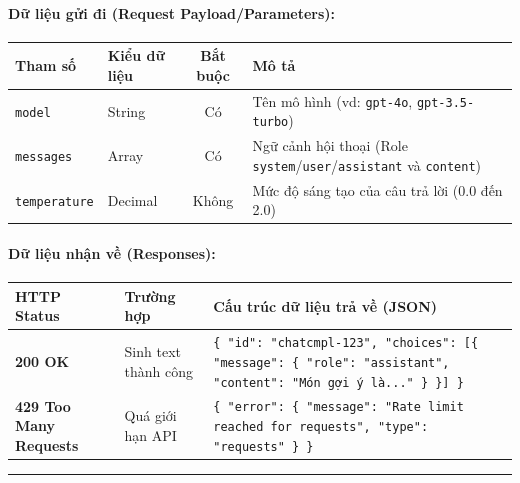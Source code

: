 \documentclass[12pt,a4paper]{article}
\begin{document}
\paragraph{Dữ liệu gửi đi (Request Payload/Parameters):}
\begin{longtable}{|>{\raggedright\arraybackslash}p{2.8cm}|>{\raggedright\arraybackslash}p{2.2cm}|c|>{\raggedright\arraybackslash}p{7.0cm}|}
\hline
\textbf{Tham số} & \textbf{Kiểu dữ liệu} & \textbf{Bắt buộc} & \textbf{Mô tả} \\ \hline
\endhead
\texttt{model} & String & Có & Tên mô hình (vd: \texttt{gpt-4o}, \texttt{gpt-3.5-turbo}) \\ \hline
\texttt{messages} & Array & Có & Ngữ cảnh hội thoại (Role \texttt{system}/\texttt{user}/\texttt{assistant} và \texttt{content}) \\ \hline
\texttt{temperature} & Decimal & Không & Mức độ sáng tạo của câu trả lời (0.0 đến 2.0) \\ \hline
\end{longtable}

\paragraph{Dữ liệu nhận về (Responses):}
\begin{longtable}{|>{\raggedright\arraybackslash}p{2.8cm}|>{\raggedright\arraybackslash}p{3.2cm}|>{\raggedright\arraybackslash}p{8.0cm}|}
\hline
\textbf{HTTP Status} & \textbf{Trường hợp} & \textbf{Cấu trúc dữ liệu trả về (JSON)} \\ \hline
\endhead
\textbf{200 OK} & Sinh text thành công & \texttt{\{ "id": "chatcmpl-123", "choices": [\{ "message": \{ "role": "assistant", "content": "Món gợi ý là..." \} \}] \}} \\ \hline
\textbf{429 Too Many Requests} & Quá giới hạn API & \texttt{\{ "error": \{ "message": "Rate limit reached for requests", "type": "requests" \} \}} \\ \hline
\end{longtable}

\vskip 0.4cm
\noindent\rule{\textwidth}{0.3pt}
\vskip 0.4cm
\end{document}
